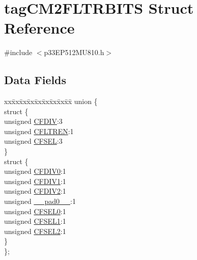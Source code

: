 \hypertarget{structtag_c_m2_f_l_t_r_b_i_t_s}{}\section{tag\+C\+M2\+F\+L\+T\+R\+B\+I\+TS Struct Reference}
\label{structtag_c_m2_f_l_t_r_b_i_t_s}


{\ttfamily \#include $<$p33\+E\+P512\+M\+U810.\+h$>$}

\subsection*{Data Fields}
\begin{DoxyCompactItemize}
\item 
\begin{tabbing}
xx\=xx\=xx\=xx\=xx\=xx\=xx\=xx\=xx\=\kill
union \{\\
\>struct \{\\
\>\>unsigned \hyperlink{structtag_c_m2_f_l_t_r_b_i_t_s_a893ad85a5c5ff41a31026a67aabcb96d}{CFDIV}:3\\
\>\>unsigned \hyperlink{structtag_c_m2_f_l_t_r_b_i_t_s_a85ad433261457df9a932a90af5069ab8}{CFLTREN}:1\\
\>\>unsigned \hyperlink{structtag_c_m2_f_l_t_r_b_i_t_s_a99780df15940d1bf27ba93d175f5f80b}{CFSEL}:3\\
\>\} \\
\>struct \{\\
\>\>unsigned \hyperlink{structtag_c_m2_f_l_t_r_b_i_t_s_a801d936cb077eadf1231d520cd686dec}{CFDIV0}:1\\
\>\>unsigned \hyperlink{structtag_c_m2_f_l_t_r_b_i_t_s_a53ee480be3ec69aea8d88e45a1fde39a}{CFDIV1}:1\\
\>\>unsigned \hyperlink{structtag_c_m2_f_l_t_r_b_i_t_s_abd46218cfab17e4af53137815971f148}{CFDIV2}:1\\
\>\>unsigned \hyperlink{structtag_c_m2_f_l_t_r_b_i_t_s_adf71f3d8410c1f1dbbc96680a92c49af}{\_\_pad0\_\_}:1\\
\>\>unsigned \hyperlink{structtag_c_m2_f_l_t_r_b_i_t_s_a20d8c88694244bc63a0138ecea229c33}{CFSEL0}:1\\
\>\>unsigned \hyperlink{structtag_c_m2_f_l_t_r_b_i_t_s_ab3beae446242496efe6f3b65b42f32f4}{CFSEL1}:1\\
\>\>unsigned \hyperlink{structtag_c_m2_f_l_t_r_b_i_t_s_a136e38e2a181ec59b7952e0a8e019fc4}{CFSEL2}:1\\
\>\} \\
\}; \\

\end{tabbing}\end{DoxyCompactItemize}


